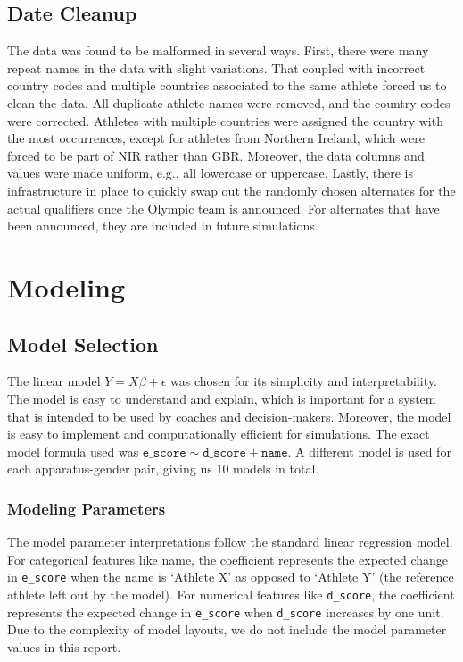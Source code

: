 \documentclass{article}
\begin{document}
\subsection{Date Cleanup}
The data was found to be malformed in several ways. First, there were many repeat 
names in the data with slight variations. That coupled with incorrect country codes 
and multiple countries associated to the same athlete forced us to clean the data. 
All duplicate athlete names were removed, and the country codes were corrected. 
Athletes with multiple countries were assigned the country with the most occurrences, 
except for athletes from Northern Ireland, which were forced to be part of NIR rather 
than GBR. Moreover, the data columns and values were made uniform, e.g., all lowercase 
or uppercase. Lastly, there is infrastructure in place to quickly swap out the randomly 
chosen alternates for the actual qualifiers once the Olympic team is announced. For 
alternates that have been announced, they are included in future simulations. 

\section{Modeling}\label{sec:modeling}

\subsection{Model Selection}
The linear model $Y = X\beta + \epsilon$ was chosen for its simplicity and interpretability. 
The model is easy to understand and explain, which is important for a system that is
intended to be used by coaches and decision-makers. Moreover, the model is easy to
implement and computationally efficient for simulations. The exact model formula used 
was $\texttt{e\_score} \sim \texttt{d\_score} + \texttt{name}$. A different model is 
used for each apparatus-gender pair, giving us 10 models in total.

\subsubsection{Modeling Parameters}
The model parameter interpretations follow the standard linear regression model. 
For categorical features like name, the coefficient represents the expected change 
in \texttt{e\_score} when the name is `Athlete X' as opposed to `Athlete Y' (the 
reference athlete left out by the model). For numerical features like \texttt{d\_score},
the coefficient represents the expected change in \texttt{e\_score} when \texttt{d\_score} increases 
by one unit. Due to the complexity of model layouts, we do not include the model 
parameter values in this report. 
\end{document}
